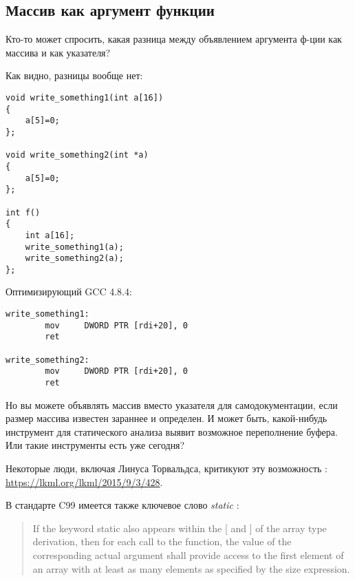 \subsection{Массив как аргумент функции}

Кто-то может спросить, какая разница между объявлением аргумента ф-ции как массива и как указателя?

Как видно, разницы вообще нет:

\begin{lstlisting}[style=customc]
void write_something1(int a[16])
{
	a[5]=0;
};

void write_something2(int *a)
{
	a[5]=0;
};

int f()
{
	int a[16];
	write_something1(a);
	write_something2(a);
};
\end{lstlisting}

Оптимизирующий GCC 4.8.4:

\begin{lstlisting}[style=customasmx86]
write_something1:
        mov     DWORD PTR [rdi+20], 0
        ret

write_something2:
        mov     DWORD PTR [rdi+20], 0
        ret
\end{lstlisting}

Но вы можете объявлять массив вместо указателя для самодокументации, если размер массива известен зараннее и определен.
И может быть, какой-нибудь инструмент для статического анализа выявит возможное переполнение буфера.
Или такие инструменты есть уже сегодня?

Некоторые люди, включая Линуса Торвальдса, критикуют эту возможность \CCpp{}: \url{https://lkml.org/lkml/2015/9/3/428}.

В стандарте C99 имеется также ключевое слово \emph{static} :

\begin{framed}
\begin{quotation}
If the keyword static also appears  within the [ and ] of the array type derivation, then for each call to the function, the value of the corresponding actual argument shall provide access to the first element of an array with at least as many elements as specified by the size expression.
\end{quotation}
\end{framed}

